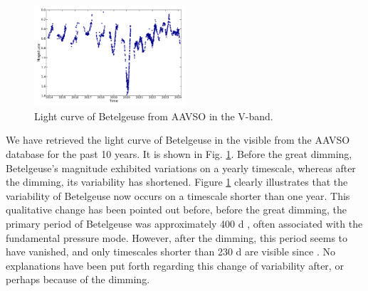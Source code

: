\documentclass{aa}
\begin{document}
\begin{figure}[!h]
    \centering
    \includegraphics[width=0.5\textwidth]{Light_curve_Betelgeuse.pdf}
    \caption{Light curve of Betelgeuse from AAVSO in the V-band.}
    \label{light curve Betelgeuse}
\end{figure}


We have retrieved the light curve of Betelgeuse in the visible from the AAVSO database for the past 10 years. It is shown in Fig. \ref{light curve Betelgeuse}.
Before the great dimming, Betelgeuse's magnitude exhibited variations on a yearly timescale, whereas after the dimming, its variability has shortened. 
Figure \ref{light curve Betelgeuse} clearly illustrates that the 
variability of Betelgeuse now occurs on a timescale shorter than one year. This qualitative change has been pointed out before,
before the great dimming, the primary period of Betelgeuse was approximately 400 d \citep{kiss_variability_2006}, often associated with the fundamental pressure mode. However, after the dimming, this period seems to have vanished, and only timescales shorter than 230 d are visible since \citep{dupree_great_2022}. 
No explanations have been put forth regarding this change of variability after, or perhaps because of the dimming. \
\end{document}
